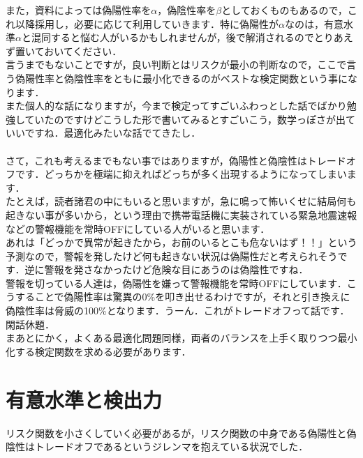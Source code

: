 \documentclass[11pt,a4paper]{ujreport} 	%
\begin{document}
また，資料によっては偽陽性率を$\alpha$，偽陰性率を$\beta$としておくものもあるので，これ以降採用し，必要に応じて利用していきます．特に偽陽性が$\alpha$なのは，有意水準$\alpha$と混同すると悩む人がいるかもしれませんが，後で解消されるのでとりあえず置いておいてください．\\

言うまでもないことですが，良い判断とはリスクが最小の判断なので，ここで言う偽陽性率と偽陰性率をともに最小化できるのがベストな検定関数という事になります．\\

また個人的な話になりますが，今まで検定ってすごいふわっとした話でばかり勉強していたのですけどこうした形で書いてみるとすごいこう，数学っぽさが出ていいですね．最適化みたいな話でてきたし．\\\\

さて，これも考えるまでもない事ではありますが，偽陽性と偽陰性はトレードオフです．どっちかを極端に抑えればどっちが多く出現するようになってしまいます．\\

たとえば，読者諸君の中にもいると思いますが，急に鳴って怖いくせに結局何も起きない事が多いから，という理由で携帯電話機に実装されている緊急地震速報などの警報機能を常時OFFにしている人がいると思います．\\

あれは「どっかで異常が起きたから，お前のいるとこも危ないはず！！」という予測なので，警報を発したけど何も起きない状況は偽陽性だと考えられそうです．逆に警報を発さなかったけど危険な目にあうのは偽陰性ですね．\\

警報を切っている人達は，偽陽性を嫌って警報機能を常時OFFにしています．こうすることで偽陽性率は驚異の0\%を叩き出せるわけですが，それと引き換えに偽陰性率は脅威の100\%となります．うーん．これがトレードオフって話です．\\

閑話休題．\\

まあとにかく，よくある最適化問題同様，両者のバランスを上手く取りつつ最小化する検定関数を求める必要があります．\\

\section{有意水準と検出力\label{sec:test-power}}
リスク関数を小さくしていく必要があるが，リスク関数の中身である偽陽性と偽陰性はトレードオフであるというジレンマを抱えている状況でした．\\
\end{document}
